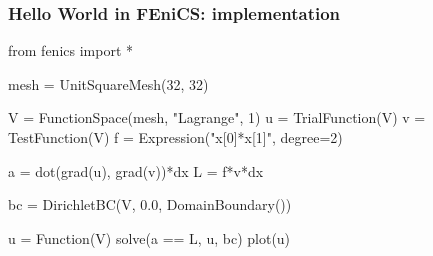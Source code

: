 \begin{frame}[fragile]
  \frametitle{Hello World in FEniCS: implementation}

    \begin{python}
from fenics import *

mesh = UnitSquareMesh(32, 32)

V = FunctionSpace(mesh, "Lagrange", 1)
u = TrialFunction(V)
v = TestFunction(V)
f = Expression("x[0]*x[1]", degree=2)

a = dot(grad(u), grad(v))*dx
L = f*v*dx

bc = DirichletBC(V, 0.0, DomainBoundary())

u = Function(V)
solve(a == L, u, bc)
plot(u)
    \end{python}

\end{frame}
